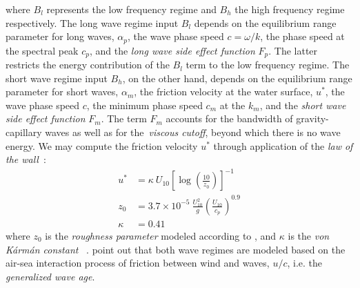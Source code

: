 %
where $B_l$ represents the low frequency regime and $B_h$ the high frequency
regime respectively. The long wave regime input $B_l$ depends on the
equilibrium range parameter for long waves, $\alpha_p$, the wave phase speed
$c = \omega/k$, the phase speed at the spectral peak $c_p$, and the \emph{long wave side
effect function} $F_p$. The latter restricts the energy contribution of the
$B_l$ term to the low frequency regime. The short wave regime input $B_h$,
on the other hand, depends on the equilibrium range parameter for short waves,
$\alpha_m$, the friction velocity at the water surface, $u^{\ast}$, the wave
phase speed $c$, the minimum phase speed $c_m$ at the \wavenumber $k_m$, and
the \emph{short wave side effect function} $F_m$. The term $F_m$ accounts for
the bandwidth of gravity-capillary waves as well as for the~\emph{viscous cutoff},
beyond which there is no wave energy. We may compute the friction velocity
$u^{\ast}$ through application of the \emph{law of the wall}~\cite{article:vonKarman1931}:
%
\begin{subequations}
\begin{align}
u^{\ast} &= \kappa~U_{10} \left[\log\left(\frac{10}{z_0}\right)\right]^{-1}\\
z_0 &= 3.7 \times 10^{-5}~\frac{U_{10}^2}{g}
\left(\frac{U_{10}}{c_p}\right)^{0.9} \label{eq:z_0}\\
\kappa &= 0.41
\end{align}
\end{subequations}
%
where $z_0$ is the \emph{roughness parameter} modeled according to
\cite{article:Donelan1993}, and $\kappa$ is the \emph{von K\'arm\'an constant}
~\citep{article:vonKarman1931}. \citeauthor{article:Elfouhaily1997}
point out that both wave regimes
are modeled based on the air-sea interaction process of friction between wind and
waves, $u/c$, i.e. the \emph{generalized wave age}.
%
%
